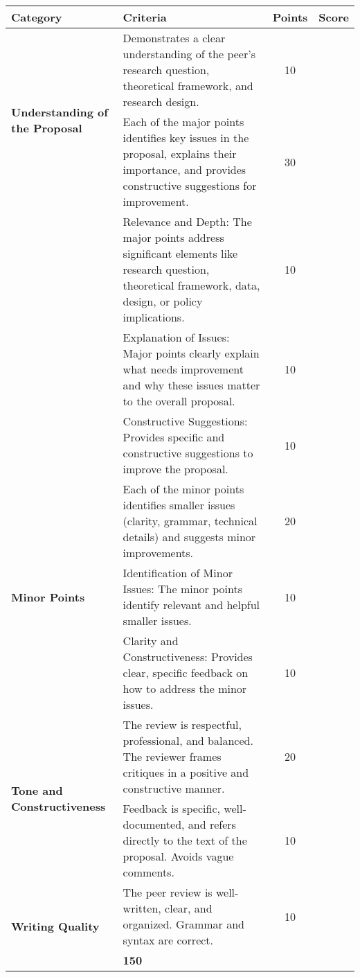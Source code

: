 \documentclass[
]{article}
\begin{document}
\begin{table}[h!]
\centering
\begin{tabular}{|l|p{8cm}|c|c|}
\hline
\textbf{Category} & \textbf{Criteria} & \textbf{Points} & \textbf{Score} \\
\hline
\multirow{2}{*}{\textbf{Understanding of the Proposal}} & Demonstrates a clear understanding of the peer's research question, theoretical framework, and research design. & 10 & \\
\hline
\multirow{3}{*}{\textbf{Major Points}} & Each of the major points identifies key issues in the proposal, explains their importance, and provides constructive suggestions for improvement. & 30 & \\
\cline{2-4}
& Relevance and Depth: The major points address significant elements like research question, theoretical framework, data, design, or policy implications. & 10 & \\
\cline{2-4}
& Explanation of Issues: Major points clearly explain what needs improvement and why these issues matter to the overall proposal. & 10 & \\
\cline{2-4}
& Constructive Suggestions: Provides specific and constructive suggestions to improve the proposal. & 10 & \\
\hline
\multirow{3}{*}{\textbf{Minor Points}} & Each of the minor points identifies smaller issues (clarity, grammar, technical details) and suggests minor improvements. & 20 & \\
\cline{2-4}
& Identification of Minor Issues: The minor points identify relevant and helpful smaller issues. & 10 & \\
\cline{2-4}
& Clarity and Constructiveness: Provides clear, specific feedback on how to address the minor issues. & 10 & \\
\hline
\multirow{2}{*}{\textbf{Tone and Constructiveness}} & The review is respectful, professional, and balanced. The reviewer frames critiques in a positive and constructive manner. & 20 & \\
\hline
\multirow{2}{*}{\textbf{Specificity of Feedback}} & Feedback is specific, well-documented, and refers directly to the text of the proposal. Avoids vague comments. & 10 & \\
\hline
\multirow{2}{*}{\textbf{Writing Quality}} & The peer review is well-written, clear, and organized. Grammar and syntax are correct. & 10 & \\
\hline
\multicolumn{3}{|r|}{\textbf{Total Points Possible:}} & \textbf{150} \\
\hline
\end{tabular}
\end{table}
\end{document}
